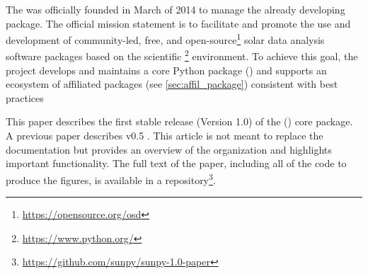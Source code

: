 The \sunpyproj was officially founded in March of 2014 to manage the already developing \sunpypkg package.
The official mission statement is to facilitate and promote the use and development of community-led, free, and open-source\footnote{\url{https://opensource.org/osd}} solar data analysis software packages based on the scientific \python\footnote{\url{https://www.python.org/}} environment.
To achieve this goal, the project develops and maintains a core Python package (\sunpypkg) and supports an ecosystem of affiliated packages (see \autoref{sec:affil_package}) consistent with best practices \citep{Wilson:2014cka}

This paper describes the first stable release (Version 1.0) of the (\sunpypkg) core package.
A previous paper describes v0.5 \citep{Community:2015cy}.
This article is not meant to replace the \sunpypkg documentation but provides an overview of the organization and highlights important functionality.
The full text of the paper, including all of the code to produce the figures, is available in a \github repository\footnote{\url{https://github.com/sunpy/sunpy-1.0-paper}}.
